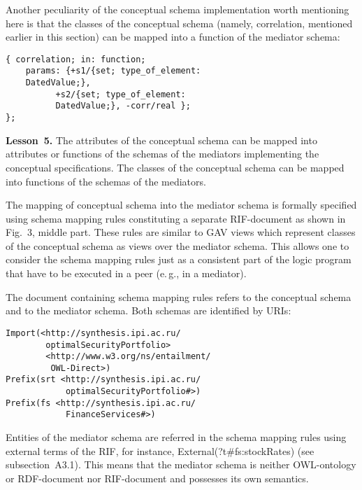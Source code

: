 \begin{multicols}{2}
  Another peculiarity of the conceptual schema implementation worth mentioning
here is that the classes of the conceptual schema (namely, {\sf correlation},
mentioned earlier in this section) can be mapped into a function of the mediator
schema:
  \begin{verbatim}
{ correlation; in: function;
    params: {+s1/{set; type_of_element:
    DatedValue;},
          +s2/{set; type_of_element:
          DatedValue;}, -corr/real };
};
  \end{verbatim}
  

  \noindent
  \textbf{Lesson~5.} The attributes of the conceptual schema can be mapped into
attributes or functions of the schemas of the mediators implementing the conceptual
specifications. The classes of the conceptual schema can be mapped into functions of the
schemas of the mediators.
{

}

  The mapping of conceptual schema into the mediator schema is formally specified
using schema mapping rules constituting a separate RIF-document as shown in
Fig.~3, middle part. These rules are similar to GAV views which represent classes of
the conceptual schema as views over the mediator schema. This allows one to consider the
schema mapping rules just as a consistent part of the logic program that have to be
executed in a peer (e.\,g., in a mediator).

  The document containing schema mapping rules refers to the conceptual schema
and to the mediator schema. Both schemas are identified by URIs:
  \begin{verbatim}
Import(<http://synthesis.ipi.ac.ru/
        optimalSecurityPortfolio>
        <http://www.w3.org/ns/entailment/
         OWL-Direct>)
Prefix(srt <http://synthesis.ipi.ac.ru/
            optimalSecurityPortfolio#>)
Prefix(fs <http://synthesis.ipi.ac.ru/
            FinanceServices#>)
  \end{verbatim}
  
\vspace*{-9pt}



  Entities of the mediator schema are referred in the schema mapping rules using
external terms of the RIF, for instance, {\sf External(?t\#fs:stockRates)}
(see subsection~A3.1). This means that the mediator schema is neither OWL-ontology or
RDF-document nor RIF-document and possesses its own semantics.


\end{multicols}
